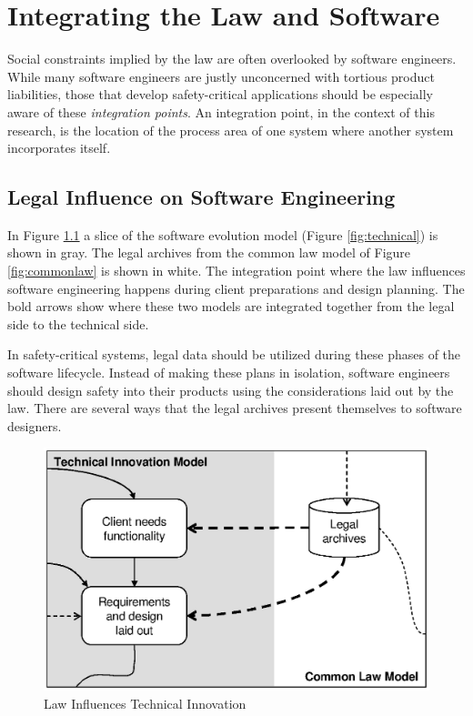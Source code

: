 \chapter{Integrating the Law and Software}

Social constraints implied by the law are often overlooked by software
engineers. While many software engineers are justly unconcerned with tortious
product liabilities, those that develop safety-critical applications should be
especially aware of these \textit{integration points}. An integration point, in
the context of this research, is the location of the process area of one system
where another system incorporates itself.

\section{Legal Influence on Software Engineering}

In Figure \ref{fig:LawOnTech} a slice of the software evolution model (Figure
\ref{fig:technical}) is shown in gray. The legal archives from the common law
model of Figure \ref{fig:commonlaw} is shown in white. The integration point
where the law influences software engineering happens during client preparations
and design planning. The bold arrows show where these two models are integrated
together from the legal side to the technical side.

In safety-critical systems, legal data should be utilized during these phases of
the software lifecycle. Instead of making these plans in isolation, software
engineers should design safety into their products using the considerations laid
out by the law. There are several ways that the legal archives present
themselves to software designers.

\begin{figure}[t]
\begin{center}
\includegraphics{figures/LawOnTech.eps}
\end{center}
\caption{Law Influences Technical Innovation}
\label{fig:LawOnTech}
\end{figure}

